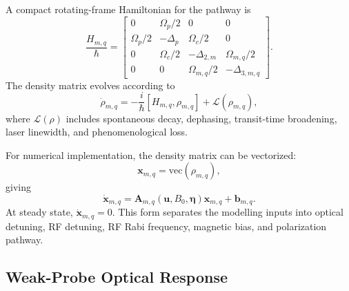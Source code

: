 \documentclass{ieeeaccess}
\begin{document}
A compact rotating-frame Hamiltonian for the pathway is
\begin{equation}
\frac{H_{m,q}}{\hbar}
=
\begin{bmatrix}
0 & \Omega_p/2 & 0 & 0\\
\Omega_p/2 & -\Delta_p & \Omega_c/2 & 0\\
0 & \Omega_c/2 & -\Delta_{2,m} & \Omega_{m,q}/2\\
0 & 0 & \Omega_{m,q}/2 & -\Delta_{3,m,q}
\end{bmatrix}.
\label{eq:annex_four_level_hamiltonian}
\end{equation}
The density matrix evolves according to
\begin{equation}
\dot{\rho}_{m,q}
=
-\frac{i}{\hbar}
[H_{m,q},\rho_{m,q}]
+
\mathcal{L}(\rho_{m,q}),
\label{eq:annex_master_equation_pathway}
\end{equation}
where \(\mathcal{L}(\rho)\) includes spontaneous decay, dephasing, transit-time broadening, laser linewidth, and phenomenological loss.

For numerical implementation, the density matrix can be vectorized:
\begin{equation}
\mathbf{x}_{m,q}
=
\mathrm{vec}(\rho_{m,q}),
\label{eq:annex_vectorized_state}
\end{equation}
giving
\begin{equation}
\dot{\mathbf{x}}_{m,q}
=
\mathbf{A}_{m,q}
(\mathbf{u},B_0,\boldsymbol{\eta})
\mathbf{x}_{m,q}
+
\mathbf{b}_{m,q}.
\label{eq:annex_state_space}
\end{equation}
At steady state, \(\dot{\mathbf{x}}_{m,q}=0\). This form separates the modelling inputs into optical detuning, RF detuning, RF Rabi frequency, magnetic bias, and polarization pathway.

\subsection{Weak-Probe Optical Response}
\label{annex:weak_probe_response}
\end{document}

